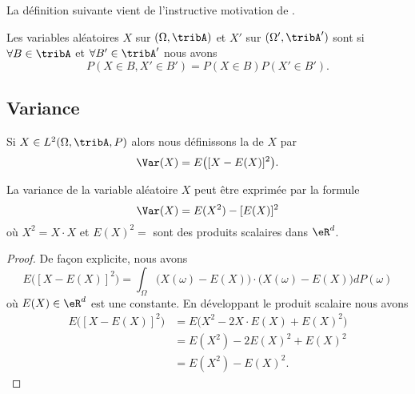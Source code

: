La définition suivante vient de l'instructive motivation de \cite{CourgGudRennes}.
\begin{definition}
    Les variables aléatoires \( X\) sur \( (\Omega,\tribA)\) et \( X'\) sur \( (\Omega',\tribA')\) sont  si \( \forall B\in\tribA\) et \( \forall B'\in\tribA'\) nous avons
    \begin{equation}
        P(X\in B,X'\in B')=P(X\in B)P(X'\in B').
    \end{equation}
\end{definition}


\subsection{Variance}

Si \( X\in L^2(\Omega,\tribA,P)\) alors nous définissons la  de \( X\) par
\begin{equation}
    \Var(X)=E\big( [X-E(X)]^2 \big).
\end{equation}

\begin{proposition}     \label{PrropVarAlterfrom}
    La variance de la variable aléatoire \( X\) peut être exprimée par la formule
    \begin{equation}
        \Var(X)=E(X^2)-[E(X)]^2
    \end{equation}
    où \( X^2=X\cdot X\) et \( E(X)^2=\) sont des produits scalaires dans \( \eR^d\).
\end{proposition}

\begin{proof}
    De façon explicite, nous avons
    \begin{equation}
        E\big( [X-E(X)]^2 \big)=\int_{\Omega}\big( X(\omega)-E(X) \big)\cdot\big( X(\omega)-E(X) \big)dP(\omega)
    \end{equation}
    où \( E(X)\in\eR^d\) est une constante. En développant le produit scalaire nous avons
    \begin{subequations}
        \begin{align}
            E\big( [X-E(X)]^2 \big)&=E\big( X^2-2X\cdot E(X)+E(X)^2 \big)\\
            &=E(X^2)-2E(X)^2+E(X)^2\\
            &=E(X^2)-E(X)^2.
        \end{align}
    \end{subequations}
\end{proof}


